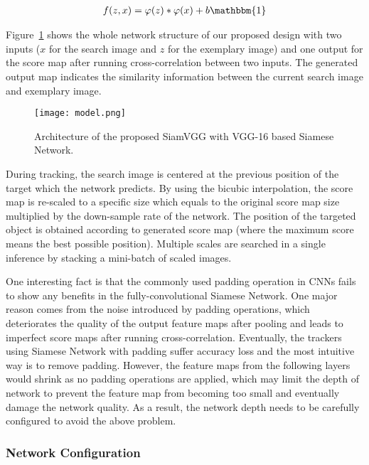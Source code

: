 \documentclass[runningheads]{llncs}
\begin{document}
\begin{align}
f(z, x) = \varphi(z) \ast \varphi(x) + b\mathbbm{1}
\end{align}

Figure~\ref{fig:model} shows the whole network structure of our proposed design with two inputs ($x$ for the search image and $z$ for the exemplary image) and one output for the score map after running cross-correlation between two inputs. The generated output map indicates the similarity information between the current search image and exemplary image. 



\begin{figure}
\centering
\texttt{[image: model.png]}
\vspace{-8pt}
\caption{Architecture of the proposed SiamVGG with VGG-16 based Siamese Network. }
\label{fig:model}
\end{figure}

During tracking, the search image is centered at the previous position of the target which the network predicts. By using the bicubic interpolation, the score map is re-scaled to a specific size which equals to the original score map size multiplied by the down-sample rate of the network. The position of the targeted object is obtained according to generated score map (where the maximum score means the best possible position). Multiple scales are searched in a single inference by stacking a mini-batch of scaled images.

One interesting fact is that the commonly used padding operation in CNNs fails to show any benefits in the fully-convolutional Siamese Network. One major reason comes from the noise introduced by padding operations, which deteriorates the quality of the output feature maps after pooling and leads to imperfect score maps after running cross-correlation. Eventually, the trackers using Siamese Network with padding suffer accuracy loss and the most intuitive way is to remove padding. However, the feature maps from the following layers would shrink as no padding operations are applied, which may limit the depth of network to prevent the feature map from becoming too small and eventually damage the network quality. 
As a result, the network depth needs to be carefully configured to avoid the above problem. 

\subsubsection{Network Configuration}
\end{document}
